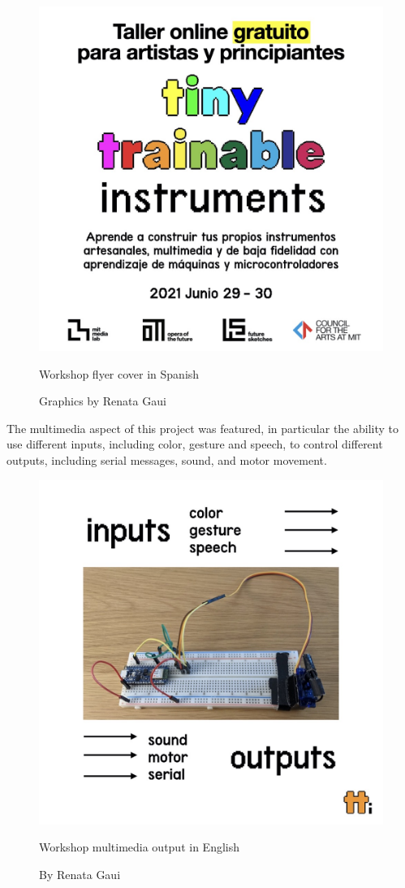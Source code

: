 \begin{figure}[ht]
  \centering
  \includegraphics[width=0.75\linewidth,height=0.35\textheight,keepaspectratio]{images/workshop-es-1.jpg}
  \caption{Workshop flyer cover in Spanish}
  \caption*{Graphics by Renata Gaui}
  \label{fig:workshop-spanish-flyer-page-1}
\end{figure}

The multimedia aspect of this project was featured, in particular the ability to use different inputs, including color, gesture and speech, to control different outputs, including serial messages, sound, and motor movement.

\begin{figure}[ht]
  \centering
  \includegraphics[width=0.75\linewidth,height=0.35\textheight,keepaspectratio]{images/workshop-en-2.jpg}
  \caption{Workshop multimedia output in English}
  \caption*{By Renata Gaui}
  \label{fig:workshop-english-flyer-page-2}
\end{figure}

